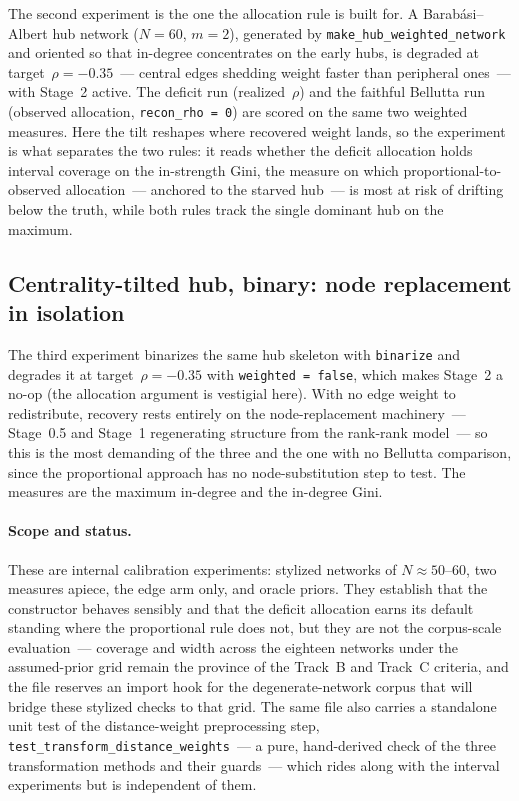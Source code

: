 \documentclass[11pt]{article}
\begin{document}
The second experiment is the one the allocation rule is built for. A
Barab\'asi--Albert hub network ($N = 60$, $m = 2$), generated by
\texttt{make\_hub\_weighted\_network} and oriented so that in-degree concentrates on
the early hubs, is degraded at target~$\rho = -0.35$~--- central edges shedding weight
faster than peripheral ones~--- with Stage~2 active. The deficit run (realized~$\rho$)
and the faithful Bellutta run (observed allocation, \texttt{recon\_rho = 0}) are scored
on the same two weighted measures. Here the tilt reshapes where recovered weight lands,
so the experiment is what separates the two rules: it reads whether the deficit
allocation holds interval coverage on the in-strength Gini, the measure on which
proportional-to-observed allocation~--- anchored to the starved hub~--- is most at risk
of drifting below the truth, while both rules track the single dominant hub on the
maximum.

\subsection{Centrality-tilted hub, binary: node replacement in isolation}

The third experiment binarizes the same hub skeleton with \texttt{binarize} and
degrades it at target~$\rho = -0.35$ with \texttt{weighted = false}, which makes
Stage~2 a no-op (the allocation argument is vestigial here). With no edge weight to
redistribute, recovery rests entirely on the node-replacement machinery~--- Stage~0.5
and Stage~1 regenerating structure from the rank-rank model~--- so this is the most
demanding of the three and the one with no Bellutta comparison, since the proportional
approach has no node-substitution step to test. The measures are the maximum in-degree
and the in-degree Gini.

\paragraph{Scope and status.} These are internal calibration experiments: stylized
networks of $N \approx 50$--$60$, two measures apiece, the edge arm only, and oracle
priors. They establish that the constructor behaves sensibly and that the deficit
allocation earns its default standing where the proportional rule does not, but they
are not the corpus-scale evaluation~--- coverage and width across the eighteen networks
under the assumed-prior grid remain the province of the Track~B and Track~C
criteria, and the file reserves an import hook for the degenerate-network corpus that
will bridge these stylized checks to that grid. The same file also carries a standalone
unit test of the distance-weight preprocessing step,
\texttt{test\_transform\_distance\_weights}~--- a pure, hand-derived check of the three
transformation methods and their guards~--- which rides along with the interval
experiments but is independent of them.
\end{document}
